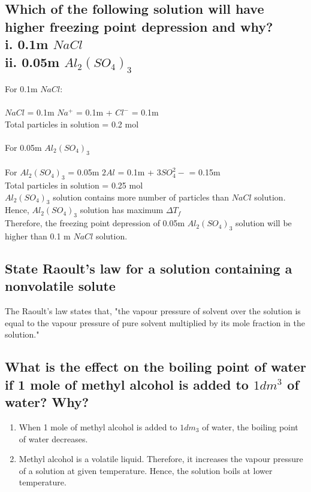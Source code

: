 \documentclass{article}
\begin{document}
   \subsection{Which of the following solution will have higher
   freezing point depression and why?\\
   i. 0.1m $NaCl$ \\
   ii. 0.05m $Al_2(SO_4)_3$} 
   For 0.1m $NaCl$:\\
    \\
   $NaCl$ = 0.1m \ce{->} $Na^+$ = 0.1m + $Cl^-$ = 0.1m \\
   Total particles in solution = 0.2 mol \\\\
   For 0.05m $Al_2(SO_4)_3$ \\
    \\
   For $Al_2(SO_4)_3$ = 0.05m \ce{->} $2Al$ = 0.1m + $3SO_4^2-$ = 0.15m
   \\Total particles in solution = 0.25 mol\\
   $Al_2(SO_4)_3$ solution contains more number of particles than $NaCl$
   solution. Hence, $Al_2(SO_4)_3$ solution has maximum $\Delta T_f$ \\
   Therefore, the freezing point depression of 0.05m $Al_2(SO_4)_3$ 
   solution will be higher than 0.1 m $NaCl$ solution.

   \subsection{State Raoult's law for a solution containing a
   nonvolatile solute}
   The Raoult's law states that, "the vapour pressure of solvent over
   the solution is equal to the vapour pressure of pure solvent
   multiplied by its mole fraction in the solution."

   \subsection{What is the effect on the boiling point of water if 1
   mole of methyl alcohol is added to $1dm^3$ of water? Why?}
   \begin{enumerate}
        \item When 1 mole of methyl alcohol is added to $1dm_3$ of
	water, the boiling point of water decreases.
	\item Methyl alcohol is a volatile liquid. Therefore, it
	increases the vapour pressure of a solution at given 
	temperature. Hence, the solution boils at lower temperature.
   \end{enumerate}
\end{document}
